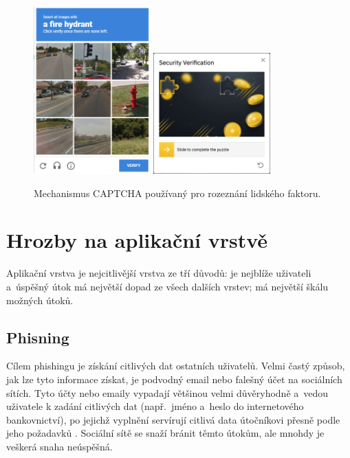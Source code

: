 \begin{figure}[hbt]
	\centering
	\includegraphics[width=0.4\textwidth]{images/captcha.png}
	\hspace{2em}
	\includegraphics[width=0.4\textwidth]{images/captcha2.png}
	\caption{Mechanismus CAPTCHA používaný pro rozeznání lidského faktoru.}
	\label{img:captcha}
\end{figure}

\section{Hrozby na aplikační vrstvě}
Aplikační vrstva je nejcitlivější vrstva ze tří důvodů: je nejblíže uživateli a~úspěšný útok má největší dopad ze všech dalších vrstev; má největší škálu možných útoků.

\subsection*{Phisning}
Cílem phishingu je získání citlivých dat ostatních uživatelů. Velmi častý způsob, jak lze tyto informace získat, je podvodný email nebo falešný účet na sociálních sítích. Tyto účty nebo emaily vypadají většinou velmi důvěryhodně a~vedou uživatele k zadání citlivých dat (např.~jméno a~heslo do internetového bankovnictví), po jejichž vyplnění servírují citlivá data útočníkovi přesně podle jeho požadavků \cite{bib:kyber_utoky}. Sociální sítě se snaží bránit těmto útokům, ale mnohdy je veškerá snaha neúspěšná.

